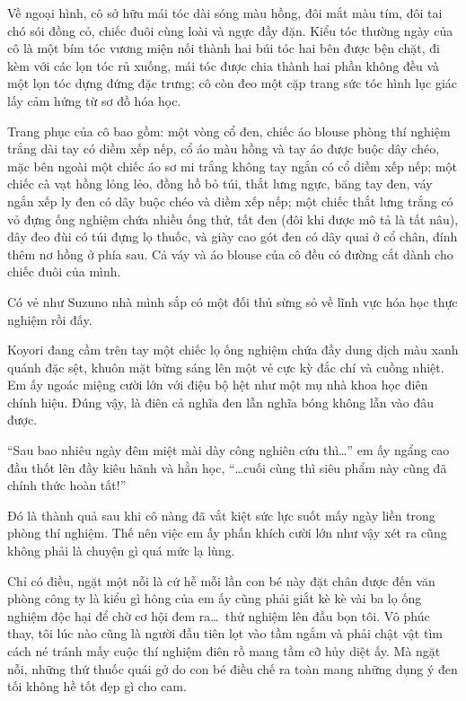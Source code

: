 \documentclass[../main.tex]{subfiles}
\begin{document}
Về ngoại hình, cô sở hữu mái tóc dài sóng màu hồng, đôi mắt màu tím, đôi tai chó sói đồng cỏ, chiếc đuôi cùng loài và ngực đầy đặn. Kiểu tóc thường ngày của cô là một bím tóc vương miện nối thành hai búi tóc hai bên được bện chặt, đi kèm với các lọn tóc rủ xuống, mái tóc được chia thành hai phần không đều và một lọn tóc dựng đứng đặc trưng; cô còn đeo một cặp trang sức tóc hình lục giác lấy cảm hứng từ sơ đồ hóa học.

Trang phục của cô bao gồm: một vòng cổ đen, chiếc áo blouse phòng thí nghiệm trắng dài tay có diềm xếp nếp, cổ áo màu hồng và tay áo được buộc dây chéo, mặc bên ngoài một chiếc áo sơ mi trắng không tay ngắn có cổ diềm xếp nếp; một chiếc cà vạt hồng lỏng lẻo, đồng hồ bỏ túi, thắt lưng ngực, băng tay đen, váy ngắn xếp ly đen có dây buộc chéo và diềm xếp nếp; một chiếc thắt lưng trắng có vỏ đựng ống nghiệm chứa nhiều ống thử, tất đen (đôi khi được mô tả là tất nâu), dây đeo đùi có túi đựng lọ thuốc, và giày cao gót đen có dây quai ở cổ chân, đính thêm nơ hồng ở phía sau. Cả váy và áo blouse của cô đều có đường cắt dành cho chiếc đuôi của mình.

\chrint

Có vẻ như Suzuno nhà mình sắp có một đối thủ sừng sỏ về lĩnh vực hóa học thực nghiệm rồi đấy.

\il

Koyori đang cầm trên tay một chiếc lọ ống nghiệm chứa đầy dung dịch màu xanh quánh đặc sệt, khuôn mặt bừng sáng lên một vẻ cực kỳ đắc chí và cuồng nhiệt. Em ấy ngoác miệng cười lớn với điệu bộ hệt như một mụ nhà khoa học điên chính hiệu. Đúng vậy, là điên cả nghĩa đen lẫn nghĩa bóng không lẫn vào đâu được.

``Sau bao nhiêu ngày đêm miệt mài dày công nghiên cứu thì\dots'' em ấy ngẩng cao đầu thốt lên đầy kiêu hãnh và hằn học, ``\dots cuối cùng thì siêu phẩm này cũng đã chính thức hoàn tất!''


Đó là thành quả sau khi cô nàng đã vắt kiệt sức lực suốt mấy ngày liền trong phòng thí nghiệm. Thế nên việc em ấy phấn khích cười lớn như vậy xét ra cũng không phải là chuyện gì quá mức lạ lùng.

Chỉ có điều, ngặt một nỗi là cứ hễ mỗi lần con bé này đặt chân được đến văn phòng công ty là kiểu gì hông của em ấy cũng phải giắt kè kè vài ba lọ ống nghiệm độc hại để chờ cơ hội đem ra\dots\ thử nghiệm lên đầu bọn tôi. Vô phúc thay, tôi lúc nào cũng là người đầu tiên lọt vào tầm ngắm và phải chật vật tìm cách né tránh mấy cuộc thí nghiệm điên rồ mang tầm cỡ hủy diệt ấy. Mà ngặt nỗi, những thứ thuốc quái gở do con bé điều chế ra toàn mang những dụng ý đen tối không hề tốt đẹp gì cho cam.
\end{document}
